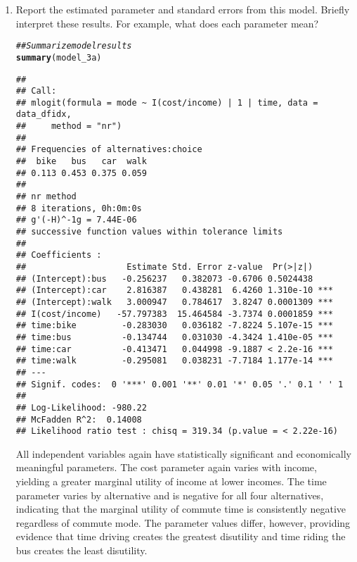 \documentclass[11pt,letterpaper]{article}\usepackage[]{graphicx}\usepackage[]{color}
\makeatletter
\newcommand{\hlcom}[1]{\textcolor[rgb]{0.678,0.584,0.686}{\textit{#1}}}%
\newcommand{\hlstd}[1]{\textcolor[rgb]{0.345,0.345,0.345}{#1}}%
\newcommand{\hlkwd}[1]{\textcolor[rgb]{0.737,0.353,0.396}{\textbf{#1}}}%
\newenvironment{kframe}{%
 \def\at@end@of@kframe{}%
 \ifinner\ifhmode%
  \def\at@end@of@kframe{\end{minipage}}%
  \begin{minipage}{\columnwidth}%
 \fi\fi%
 \def\FrameCommand##1{\hskip\@totalleftmargin \hskip-\fboxsep
 \colorbox{shadecolor}{##1}\hskip-\fboxsep
     \hskip-\linewidth \hskip-\@totalleftmargin \hskip\columnwidth}%
 \MakeFramed {\advance\hsize-\width
   \@totalleftmargin\z@ \linewidth\hsize
   \@setminipage}}%
 {\par\unskip\endMakeFramed%
 \at@end@of@kframe}
\newenvironment{knitrout}{}{} %
\makeatother
\begin{document}
\begin{enumerate}[label=\alph*., leftmargin=*]
	\begin{enumerate}[label=\roman*.]
		\item Report the estimated parameter and standard errors from this model. Briefly interpret these results. For example, what does each parameter mean?

\begin{knitrout}
\color{fgcolor}\begin{kframe}
\begin{alltt}
\hlcom{## Summarize model results}
\hlkwd{summary}\hlstd{(model_3a)}
\end{alltt}
\begin{verbatim}
## 
## Call:
## mlogit(formula = mode ~ I(cost/income) | 1 | time, data = data_dfidx, 
##     method = "nr")
## 
## Frequencies of alternatives:choice
##  bike   bus   car  walk 
## 0.113 0.453 0.375 0.059 
## 
## nr method
## 8 iterations, 0h:0m:0s 
## g'(-H)^-1g = 7.44E-06 
## successive function values within tolerance limits 
## 
## Coefficients :
##                    Estimate Std. Error z-value  Pr(>|z|)    
## (Intercept):bus   -0.256237   0.382073 -0.6706 0.5024438    
## (Intercept):car    2.816387   0.438281  6.4260 1.310e-10 ***
## (Intercept):walk   3.000947   0.784617  3.8247 0.0001309 ***
## I(cost/income)   -57.797383  15.464584 -3.7374 0.0001859 ***
## time:bike         -0.283030   0.036182 -7.8224 5.107e-15 ***
## time:bus          -0.134744   0.031030 -4.3424 1.410e-05 ***
## time:car          -0.413471   0.044998 -9.1887 < 2.2e-16 ***
## time:walk         -0.295081   0.038231 -7.7184 1.177e-14 ***
## ---
## Signif. codes:  0 '***' 0.001 '**' 0.01 '*' 0.05 '.' 0.1 ' ' 1
## 
## Log-Likelihood: -980.22
## McFadden R^2:  0.14008 
## Likelihood ratio test : chisq = 319.34 (p.value = < 2.22e-16)
\end{verbatim}
\end{kframe}
\end{knitrout}

		All independent variables again have statistically significant and economically meaningful parameters. The cost parameter again varies with income, yielding a greater marginal utility of income at lower incomes. The time parameter varies by alternative and is negative for all four alternatives, indicating that the marginal utility of commute time is consistently negative regardless of commute mode. The parameter values differ, however, providing evidence that time driving creates the greatest disutility and time riding the bus creates the least disutility.


\end{enumerate}
\end{enumerate}
\end{document}
